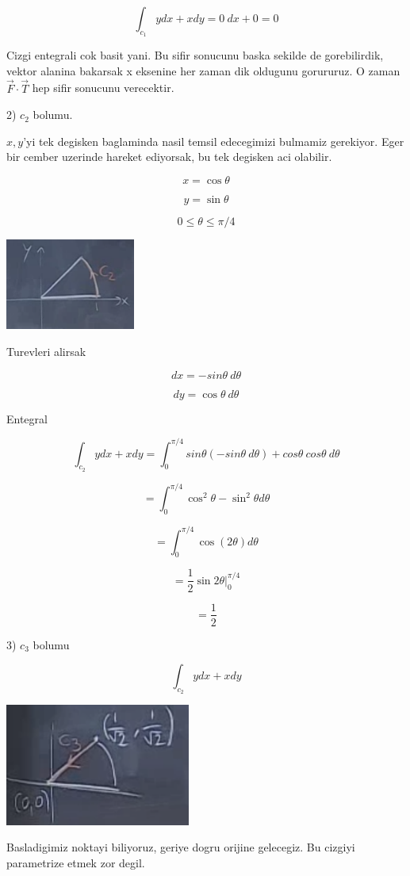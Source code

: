 \documentclass[12pt,fleqn]{article}\usepackage{../common}
\begin{document}
\[ \int_{c_1} y dx + x dy = 0 \ dx + 0 = 0\]

Cizgi entegrali cok basit yani. Bu sifir sonucunu baska sekilde de
gorebilirdik, vektor alanina bakarsak x eksenine her zaman dik oldugunu
gorururuz. O zaman $\vec{F}\cdot \vec{T}$ hep sifir sonucunu verecektir. 

2) $c_2$ bolumu. 

$x,y$'yi tek degisken baglaminda nasil temsil edecegimizi bulmamiz
gerekiyor. Eger bir cember uzerinde hareket ediyorsak, bu tek degisken aci
olabilir. 

\[ x = \cos\theta \]

\[ y = \sin\theta \]

\[ 0 \le \theta \le \pi / 4 \]

\includegraphics[height=3cm]{20_3.png}

Turevleri alirsak

\[ dx = -sin\theta \ d\theta\]

\[ dy = \cos\theta \ d\theta \]

Entegral

\[ \int_{c_2} y dx + x dy = 
\int_0^{\pi/4} sin\theta (-sin\theta \ d\theta)  + 
cos\theta \ cos\theta \ d\theta
\]

\[ = \int_0^{\pi/4} \cos^2\theta - \sin^2\theta d\theta \]

\[ = \int_0^{\pi/4} \cos(2\theta) d\theta \]

\[ = \frac{1}{2}\sin 2\theta \bigg|_0^{\pi/4} \]

\[ = \frac{1}{2} \]

3) $c_3$ bolumu

\[ \int_{c_2} y dx + x dy \]

\includegraphics[height=4cm]{20_4.png}

Basladigimiz noktayi biliyoruz, geriye dogru orijine gelecegiz. Bu cizgiyi
parametrize etmek zor degil. 
\end{document}
